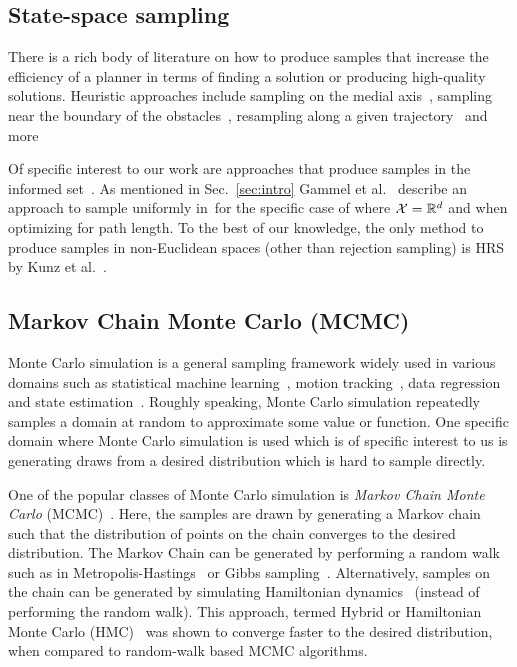 \documentclass[letterpaper, 10 pt, conference]{ieeeconf}  %
\begin{document}
%


\subsection{State-space sampling}
\label{subsec:sampling}
There is a rich body of literature on how to produce samples that increase the efficiency of a planner in terms of finding a solution or producing high-quality solutions.
Heuristic approaches include
sampling on the medial axis~\cite{WAS99a, WAS99b, LTA03, YDLTA14},
sampling near the boundary of the obstacles~\cite{ABDJV98, YTEA12},
resampling along a given trajectory~\cite{APD11, AS11}
and more~\cite{US03, SWT09}

Of specific interest to our work are approaches that produce samples in the informed set~\Cinf.
As mentioned in Sec.~\ref{sec:intro} Gammel et al.~\cite{GSB14} describe an approach to sample uniformly in~\Cinf for the specific case of where $\mathcal{X} = \mathbb{R}^d$ and when optimizing for path length.
To the best of our knowledge, the only method to produce samples in non-Euclidean spaces (other than rejection sampling) is HRS by Kunz et al.~\cite{KTC16}.

\subsection{Markov Chain Monte Carlo (MCMC)}
\label{subsec:mcmc}
Monte Carlo simulation is a general sampling framework widely used in various domains such as
statistical machine learning~\cite{M97},
motion tracking~\cite{KBD04}, 
data regression~\cite{TL11} and 
state estimation~\cite{ASC13}.
Roughly speaking, Monte Carlo simulation repeatedly samples a domain at random to approximate some value or function.
One specific domain where Monte Carlo simulation is used which is of specific interest to us is generating draws from a desired distribution which is hard to sample directly.

One of the popular classes of Monte Carlo simulation is 
\emph{Markov Chain Monte Carlo} (MCMC)~\cite{ADDJ03}.
Here, the samples are drawn by generating a Markov chain such that the distribution of points on the chain converges to the desired distribution.
The Markov Chain can be generated by performing a random walk such as
in Metropolis-Hastings~\cite{CG95} or Gibbs sampling~\cite{CK94}.
Alternatively, samples on the chain can be generated by simulating Hamiltonian dynamics~\cite{N92} (instead of performing the random walk).
This approach, termed Hybrid or Hamiltonian Monte Carlo (HMC)~\cite{N11} was shown to converge faster to the desired distribution, when compared to random-walk based MCMC algorithms.
\end{document}
